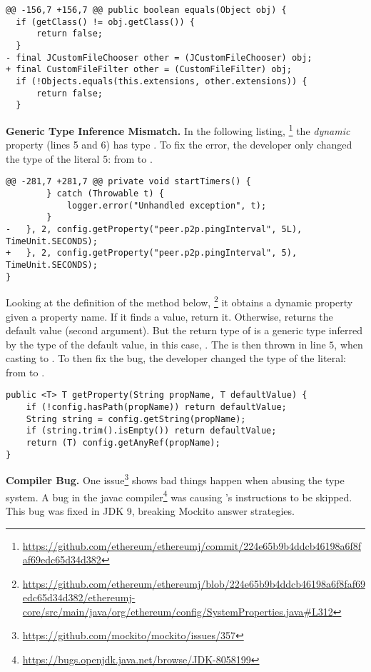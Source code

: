 \begin{lstlisting}[style=java]
@@ -156,7 +156,7 @@ public boolean equals(Object obj) {
  if (getClass() != obj.getClass()) {
      return false;
  }
- final JCustomFileChooser other = (JCustomFileChooser) obj;
+ final CustomFileFilter other = (CustomFileFilter) obj;
  if (!Objects.equals(this.extensions, other.extensions)) {
      return false;
  }
\end{lstlisting}

\textbf{Generic Type Inference Mismatch.}
In the following listing,%
\footnote{\url{https://github.com/ethereum/ethereumj/commit/224e65b9b4ddcb46198a6f8faf69edc65d34d382}}
the \emph{dynamic} property  (lines 5 and 6) has type .
To fix the error, the developer only changed the type of the
literal 5: from  to .

\begin{lstlisting}[style=java]
@@ -281,7 +281,7 @@ private void startTimers() {
        } catch (Throwable t) {
            logger.error("Unhandled exception", t);
        }
-   }, 2, config.getProperty("peer.p2p.pingInterval", 5L), TimeUnit.SECONDS);
+   }, 2, config.getProperty("peer.p2p.pingInterval", 5), TimeUnit.SECONDS);
}
\end{lstlisting}

Looking at the definition of the  method below,%
\footnote{\url{https://github.com/ethereum/ethereumj/blob/224e65b9b4ddcb46198a6f8faf69edc65d34d382/ethereumj-core/src/main/java/org/ethereum/config/SystemProperties.java\#L312}}
it obtains a dynamic property given a property name.
If it finds a value, return it.
Otherwise, returns the default value (second argument).
But the return type of  is a generic type inferred
by the type of the default value, in this case, .
The  is then thrown in line $5$,
when casting  to .
To then fix the bug, the developer changed the type of the literal:
from  to .

\begin{lstlisting}[style=java]
public <T> T getProperty(String propName, T defaultValue) {
    if (!config.hasPath(propName)) return defaultValue;
    String string = config.getString(propName);
    if (string.trim().isEmpty()) return defaultValue;
    return (T) config.getAnyRef(propName);
}
\end{lstlisting}

\textbf{Compiler Bug.}
One issue\footnote{\url{https://github.com/mockito/mockito/issues/357}} shows bad things happen when abusing the type system.
A bug in the \textsf{javac} compiler\footnote{\url{https://bugs.openjdk.java.net/browse/JDK-8058199}} was causing \jvm{}'s  instructions to be skipped.
This bug was fixed in JDK 9, breaking Mockito answer strategies.

